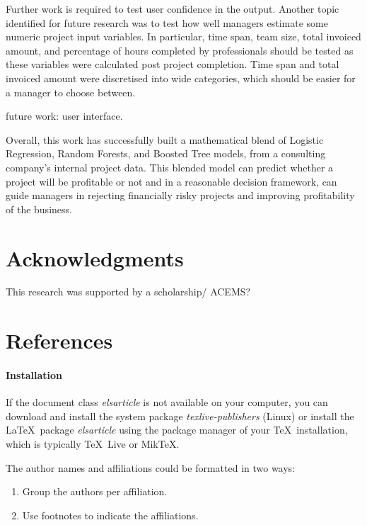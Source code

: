 \documentclass[]{elsarticle} %
\begin{document}
Further work is required to test user confidence in the output. Another
topic identified for future research was to test how well managers
estimate some numeric project input variables. In particular, time span,
team size, total invoiced amount, and percentage of hours completed by
professionals should be tested as these variables were calculated post
project completion. Time span and total invoiced amount were discretised
into wide categories, which should be easier for a manager to choose
between.

future work: user interface.

Overall, this work has successfully built a mathematical blend of
Logistic Regression, Random Forests, and Boosted Tree models, from a
consulting company's internal project data. This blended model can
predict whether a project will be profitable or not and in a reasonable
decision framework, can guide managers in rejecting financially risky
projects and improving profitability of the business.

\section{Acknowledgments}\label{acknowledgments}

This research was supported by a scholarship/ ACEMS?

\section*{References}\label{references}

\paragraph{Installation}\label{installation}

If the document class \emph{elsarticle} is not available on your
computer, you can download and install the system package
\emph{texlive-publishers} (Linux) or install the LaTeX~package
\emph{elsarticle} using the package manager of your TeX~installation,
which is typically TeX~Live or MikTeX.

The author names and affiliations could be formatted in two ways:

\begin{enumerate}
\def\labelenumi{(\arabic{enumi})}
\item
  Group the authors per affiliation.
\item
  Use footnotes to indicate the affiliations.
\end{enumerate}
\end{document}
